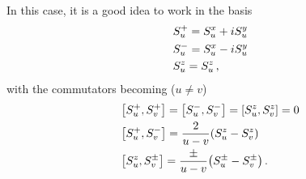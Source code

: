         In this case, it is a good idea to work in the basis
        \begin{align}
            & S^+_u = S^x_u + i S^y_u \\
            & S^-_u = S^x_u - i S^y_u \\
            & S^z_u = S^z_u \thinspace ,
        \end{align}
        with the commutators becoming ($u \neq v$)
        \begin{align}
            & \comm{S^+_u}{S^+_v} = \comm{S^-_u}{S^-_v} = \comm{S^z_u}{S^z_v} = 0 \label{eq:gaudin_commutators_pp} \\
            & \comm{S^+_u}{S^-_v} = \frac{2}{u-v} \qty(S^z_u - S^z_v) \label{eq:gaudin_commutators_pm} \\
            & \comm{S^z_u}{S^\pm_v} = \frac{\pm}{u - v} \qty(S^\pm_u - S^\pm_v) \label{eq:gaudin_commutators_zpm} \thinspace .
        \end{align}

